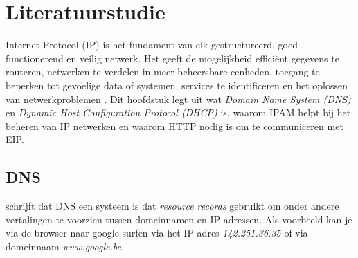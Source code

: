


\section{Literatuurstudie}
\label{sec:begrippen}
Internet Protocol (IP) is het fundament van elk gestructureerd, goed functionerend en veilig netwerk. Het geeft de mogelijkheid efficiënt gegevens te routeren, netwerken te verdelen in meer beheersbare eenheden, toegang te beperken tot gevoelige data of systemen, services te identificeren en het oplossen van netwerkproblemen \autocite{Postel1981}. Dit hoofdstuk legt uit wat \textit{Domain Name System (DNS)} en \textit{Dynamic Host Configuration Protocol (DHCP)} is, waarom IPAM helpt bij het beheren van IP netwerken en waarom HTTP nodig is om te communiceren met EIP. 

\subsection{DNS}
\textcite{Mockapetris1987} schrijft dat DNS een systeem is dat \textit{resource records} gebruikt om onder andere vertalingen te voorzien tussen domeinnamen en IP-adressen. Als voorbeeld kan je via de browser naar google surfen via het IP-adres \textit{142.251.36.35} of via domeinnaam \textit{www.google.be}.

